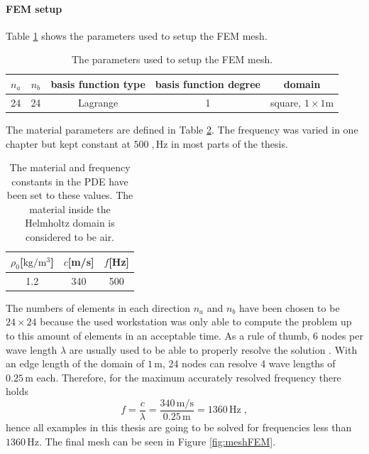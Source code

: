 \documentclass[%
  a4paper,oneside,%
  11pt,%
  smallchapters,
  style=printdev,
  extramargin,
  green,%
  rgb, <cmyk>
  ]{tubsbook}
\begin{document}
\paragraph{FEM setup}
Table \ref{tab:FEMSetup} shows the parameters used to setup the FEM mesh.  
\begin{table}[]
\centering
\caption{The parameters used to setup the FEM mesh.}
\label{tab:FEMSetup}
\begin{tabular}{@{}ccccc@{}}
\toprule
$n_a$ & $n_b$ & basis function type & basis function degree & domain               \\ \midrule
24    & 24    & Lagrange            & 1                     & square, $1\times 1$m \\ \bottomrule
\end{tabular}
\end{table}
The material parameters are defined in Table \ref{tab:MatSetup}. The frequency was varied in one chapter but kept constant at $500\;,\mathrm{Hz}$ in most parts of the thesis.
\begin{table}[]
\centering
\caption{The material and frequency constants in the PDE have been set to these values. The material inside the Helmholtz domain is considered to be air.}
\label{tab:MatSetup}
\begin{tabular}{@{}ccc@{}}
\toprule
$\rho_0${[}$\mathrm{kg/m^3}${]} & $c${[}m/s{]} & $f${[}Hz{]} \\ \midrule
1.2                   & 340          & 500         \\ \bottomrule
\end{tabular}
\end{table}
The numbers of elements in each direction $n_a$ and $n_b$ have been chosen to be $24\times 24$ because the used workstation was only able to compute the problem up to this amount of elements in an acceptable time. As a rule of thumb, 6 nodes per wave length $\lambda$ are usually used to be able to properly resolve the solution \cite{Marburga}. With an edge length of the domain of $1 \, \mathrm{m}$, 24 nodes can resolve 4 wave lengths of $0.25\, \mathrm{m}$ each. Therefore, for the maximum accurately resolved frequency there holds 
\begin{equation}
f = \frac{c}{\lambda} = \frac{340\,\mathrm{m/s}}{0.25 \, \mathrm{m}} = 1360 \, \mathrm{Hz} \;,
\end{equation}
hence all examples in this thesis are going to be solved for frequencies less than $1360\, \mathrm{Hz}$.
The final mesh can be seen in Figure \ref{fig:meshFEM}.
\end{document}
